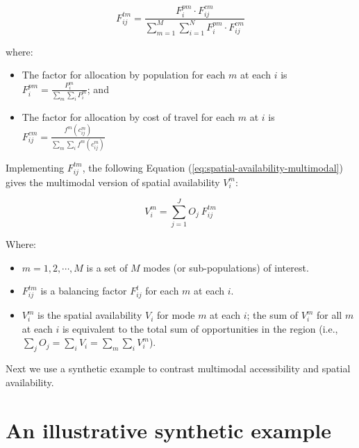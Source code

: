 \documentclass[10pt,letterpaper]{article}
\providecommand{\tightlist}{%
  \setlength{\itemsep}{0pt}\setlength{\parskip}{0pt}}
\begin{document}
\begin{equation}
\label{eq:multimodal-balancing-factors}
F^{tm}_{ij} = \frac{F^{pm}_{i} \cdot F^{cm}_{ij}}{\sum_{m=1}^M \sum_{i=1}^N F^{pm}_{i} \cdot F^{cm}_{ij}}
\end{equation}

\noindent where:

\begin{itemize}
\tightlist
\item
  The factor for allocation by population for each \(m\) at each \(i\)
  is \(F^{pm}_{i} = \frac{P_{i}^m}{\sum_{m}\sum_{i} P_{i}^m}\); and
\item
  The factor for allocation by cost of travel for each \(m\) at \(i\) is
  \(F_{ij}^{cm} = \frac{f^m(c_{ij}^m)}{\sum_{m} \sum_{i} f^m(c_{ij}^m)}\)
\end{itemize}

Implementing \(F^{tm}_{ij}\), the following Equation
(\ref{eq:spatial-availability-multimodal}) gives the multimodal version
of spatial availability \(V_i^m\):

\begin{equation}
\label{eq:spatial-availability-multimodal}
V^m_{i} = \sum_{j=1}^J O_j\ F^{tm}_{ij}
\end{equation}

\noindent Where:

\begin{itemize}
\tightlist
\item
  \(m = 1, 2,\cdots, M\) is a set of \(M\) modes (or sub-populations) of
  interest.
\item
  \(F^{tm}_{ij}\) is a balancing factor \(F^t_{ij}\) for each \(m\) at
  each \(i\).
\item
  \(V^m_{i}\) is the spatial availability \(V_{i}\) for mode \(m\) at
  each \(i\); the sum of \(V^m_{i}\) for all \(m\) at each \(i\) is
  equivalent to the total sum of opportunities in the region (i.e.,
  \(\sum_j O_j = \sum_i V_i = \sum_{m} \sum_{i} V^m_{i}\)).
\end{itemize}

Next we use a synthetic example to contrast multimodal accessibility and
spatial availability.

\hypertarget{an-illustrative-synthetic-example}{%
\section{An illustrative synthetic
example}\label{an-illustrative-synthetic-example}}
\end{document}
